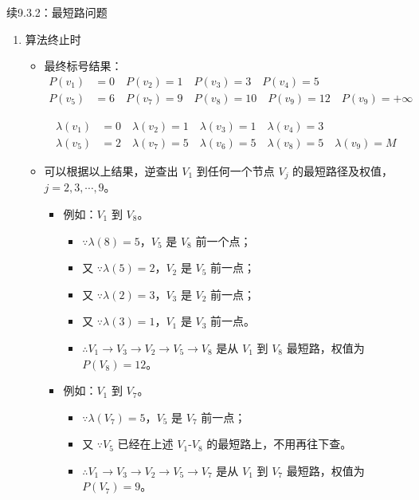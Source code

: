 \begin{exbox}{续9.3.2：最短路问题}{}
\begin{enumerate}[label=(\arabic*)]
    \item 算法终止时
    \begin{itemize}
        \item 最终标号结果：
		\[
		\begin{aligned}
			P(v_1) &= 0 \quad P(v_2) = 1 \quad P(v_3) = 3 \quad P(v_4) = 5 \\
			P(v_5) &= 6 \quad P(v_7) = 9 \quad P(v_8) = 10 \quad P(v_9) = 12 \quad P(v_9) = +\infty
		\end{aligned}
		\]

		\[
		\begin{aligned}
			\lambda(v_1) &= 0 \quad \lambda(v_2) = 1 \quad \lambda(v_3) = 1 \quad \lambda(v_4) = 3 \\
			\lambda(v_5) &= 2 \quad \lambda(v_7) = 5 \quad \lambda(v_6) = 5 \quad \lambda(v_8) = 5 \quad \lambda(v_9) = M
		\end{aligned}
		\]
        \item 可以根据以上结果，逆查出 \( V_1 \) 到任何一个节点 \( V_j \) 的最短路径及权值，\( j = 2, 3, \cdots, 9 \)。
        \begin{itemize}
            \item 例如：\( V_1 \) 到 \( V_8 \)。
            \begin{itemize}
                \item \(\because \lambda(8) = 5 \)，\( V_5 \) 是 \( V_8 \) 前一个点；
                \item 又 \(\because \lambda(5) = 2 \)，\( V_2 \) 是 \( V_5 \) 前一点；
                \item 又 \(\because \lambda(2) = 3 \)，\( V_3 \) 是 \( V_2 \) 前一点；
                \item 又 \(\because \lambda(3) = 1 \)，\( V_1 \) 是 \( V_3 \) 前一点。
                \item \(\therefore V_1 \to V_3 \to V_2 \to V_5 \to V_8 \) 是从 \( V_1 \) 到 \( V_8 \) 最短路，权值为 \( P(V_8) = 12 \)。
            \end{itemize}
            \item 例如：\( V_1 \) 到 \( V_7 \)。
            \begin{itemize}
                \item \(\because \lambda(V_7) = 5 \)，\( V_5 \) 是 \( V_7 \) 前一点；
                \item 又 \(\because V_5 \) 已经在上述 \( V_1 \)-\( V_8 \) 的最短路上，不用再往下查。
                \item \(\therefore V_1 \to V_3 \to V_2 \to V_5 \to V_7 \) 是从 \( V_1 \) 到 \( V_7 \) 最短路，权值为 \( P(V_7) = 9 \)。
            \end{itemize}
        \end{itemize}
    \end{itemize}
\end{enumerate}	
\end{exbox}
